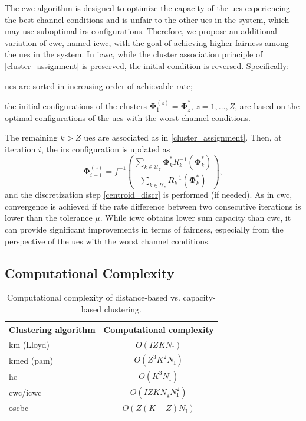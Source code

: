 The \gls{cwc} algorithm is designed to optimize the capacity of the \glspl{ue} experiencing the best channel conditions and is unfair to the other \glspl{ue} in the system, which may use suboptimal \gls{irs} configurations. 
Therefore, we propose an additional variation of \gls{cwc}, named \gls{icwc}, with the goal of achieving higher fairness among the \glspl{ue} in the system.
In \gls{icwc}, while the cluster association principle of \eqref{cluster_assignment} is preserved, the initial condition is reversed. Specifically:
\begin{enumerate*}[label=(\textit{\roman*})]
\item \glspl{ue} are sorted in increasing order of achievable rate;
\item the initial configurations of the clusters $\bm{\Phi}_1^{(z)} = \bm{\Phi}^*_z$, $z = 1,\ldots, Z$, are based on the optimal configurations of the \glspl{ue} with the worst channel conditions. 
\end{enumerate*}
The remaining $k>Z$ \glspl{ue} are associated as in \eqref{cluster_assignment}.
Then, at iteration $i$, the \gls{irs} configuration is updated as
\begin{equation}\label{centroidICWC}
    \bm{\Phi}^{(z)}_{i+1} = f^{-1}\left(\frac{\sum_{k \in \mathcal{U}_z}  \bm{\Phi}^*_kR_k^{-1}(\bm{\Phi}^*_k)}{\sum_{k \in \mathcal{U}_z}R_k^{-1}(\bm{\Phi}^*_k)}\right),
\end{equation}
and the discretization step \eqref{centroid_discr} is performed (if needed). 
As in \gls{cwc}, convergence is achieved if the rate difference between two consecutive iterations is lower than the tolerance $\mu$.  
While \gls{icwc} obtains lower sum capacity than \gls{cwc}, it can provide significant improvements in terms of fairness, especially from the perspective of the \glspl{ue} with the worst channel conditions.

\subsection{Computational Complexity}\label{complexity}

\begin{table} 
\centering
\caption{Computational complexity of distance-based vs. capacity-based clustering.}
\label{tab:clustering}
  \small
\begin{tabular}{lc}
  \toprule
Clustering algorithm & Computational complexity\\\midrule
\gls{km} (Lloyd) & $O(IZKN_{\mathrm I})$\\
\gls{kmed} (\gls{pam})& $O(Z^3K^2N_{\mathrm I})$\\
\gls{hc} & $O(K^3N_{\mathrm I})$ \\ \midrule
\gls{cwc}/\gls{icwc} & $O(IZKN_{\mathrm g}N_{\mathrm I}^2)$\\
\gls{oscbc} & $O(Z(K-Z)N_{\mathrm I})$\\
\bottomrule
\end{tabular}
\end{table}

